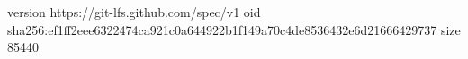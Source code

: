 version https://git-lfs.github.com/spec/v1
oid sha256:ef1ff2eee6322474ca921c0a644922b1f149a70c4de8536432e6d21666429737
size 85440
